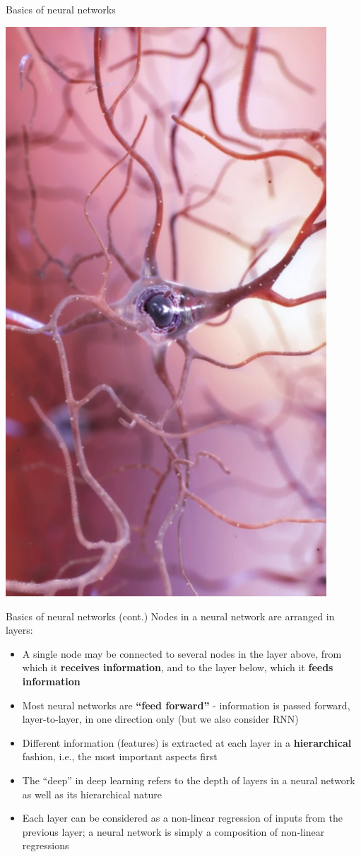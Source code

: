 \documentclass{beamer}
\begin{document}
\begin{frame}{Basics of neural networks}
\begin{minipage}{0.29\linewidth}
\includegraphics[width=0.9\textwidth]{Images/neuron.jpg}
\end{minipage}
\end{frame}
\begin{frame}{Basics of neural networks (cont.)}
 Nodes in a neural network are arranged in layers:
\begin{itemize}
\item A single node may be connected to several nodes in the layer above, from which it \textbf{receives information}, and to the layer below, which it \textbf{feeds information}
\item Most neural networks are \textbf{``feed forward''} - information is passed forward, layer-to-layer, in one direction only (but we also consider RNN)
\item Different information (features) is extracted at each layer in a \textbf{hierarchical} fashion, i.e., the most important aspects first
\item The ``deep'' in deep learning refers to the depth of layers in a neural network as well as its hierarchical nature
\item Each layer can be considered as a non-linear regression of inputs from the previous layer; a neural network is simply a composition of non-linear regressions
\end{itemize}
\end{frame}
\end{document}
